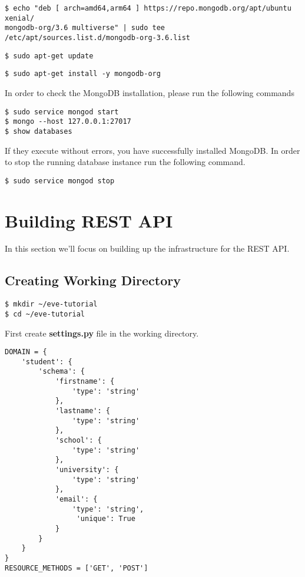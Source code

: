 \documentclass{article}
\begin{document}
\begin{verbatim}
$ echo "deb [ arch=amd64,arm64 ] https://repo.mongodb.org/apt/ubuntu xenial/
mongodb-org/3.6 multiverse" | sudo tee /etc/apt/sources.list.d/mongodb-org-3.6.list
\end{verbatim}

\begin{verbatim}
$ sudo apt-get update
\end{verbatim}

\begin{verbatim}
$ sudo apt-get install -y mongodb-org
\end{verbatim}


In order to check the MongoDB installation, please run the following commands

\begin{verbatim}
$ sudo service mongod start
$ mongo --host 127.0.0.1:27017
$ show databases
\end{verbatim}

If they execute without errors, you have successfully installed
MongoDB. In order to stop the running database instance run the
following command.

\begin{verbatim}
$ sudo service mongod stop
\end{verbatim}

\section{Building REST API}

In this section we'll focus on building up the infrastructure for the
REST API.

\subsection{Creating Working Directory}


\begin{verbatim}
$ mkdir ~/eve-tutorial
$ cd ~/eve-tutorial
\end{verbatim}

First create \textbf{settings.py} file in the working directory. 

\begin{verbatim}
DOMAIN = {
    'student': {
        'schema': {
            'firstname': {
                'type': 'string'
            },
            'lastname': {
                'type': 'string'
            },
            'school': {
                'type': 'string'
            },
            'university': {
                'type': 'string'
            },
            'email': {
                'type': 'string',
                 'unique': True
            }
        }
    }
}
RESOURCE_METHODS = ['GET', 'POST']
\end{verbatim}
\end{document}
